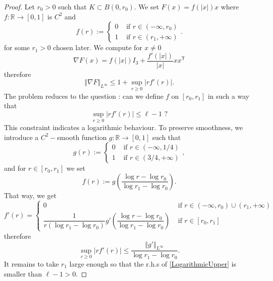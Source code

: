 \documentclass[a4paper, 12pt]{amsart}
\numberwithin{equation}{section}
\newcommand{\R}{\mathbb{R}} %
\newcommand{\lp}{\left(} %
\newcommand{\rp}{\right)} %
\newcommand{\lv}{\left\vert} %
\newcommand{\rv}{\right\vert} %
\newcommand{\lV}{\left\Vert} %
\newcommand{\rV}{\right\Vert} %
\newcommand{\Tsf}{\mathsf{T}} %
\begin{document}
\begin{proof}
    Let $r_0>0$ such that $K\subset B(0,r_0)$. We set $F(x)=f(\lv x\rv)x$ where $f:\R\rightarrow[0,1]$ is $C^2$ and
    \begin{equation*}
        f(r):=\left\{
        \begin{array}{ll}
            0 &\mbox{ if } r\in (-\infty,r_0)\\
            
            1 &\mbox{ if } r\in(r_1,+\infty)
        \end{array}.
        \right.
    \end{equation*}
    for some $r_1>0$ chosen later. We compute for $x\not=0$
    \begin{equation*}
        \nabla F(x)=f(\lv x\rv)I_3+\frac{f'(\lv x\rv)}{\lv x\rv}xx^\Tsf
    \end{equation*}
    therefore 
    \begin{equation*}
        \lV\nabla F\rV_{L^\infty}\leq 1+\sup_{r\geq0}\lv rf'(r)\rv.
    \end{equation*}
    The problem reduces to the question : can we define $f$ on $[r_0,r_1]$ in such a way that 
    \begin{equation*}
        \sup_{r\geq0}\lv rf'(r)\rv\leq\ell-1\mbox{ ?}
    \end{equation*}
    This constraint indicates a logarithmic behaviour. To preserve smoothness, we introduce a $C^2-$smooth function $g:\R\rightarrow[0,1]$ such that
    \begin{equation*}
         g(r):=\left\{
        \begin{array}{ll}
            0 &\mbox{ if } r\in (-\infty,1/4)\\
            
            1 &\mbox{ if } r\in(3/4,+\infty)
        \end{array},
        \right.
    \end{equation*}
    and for $r\in[r_0,r_1]$ we set
    \begin{equation*}
        f(r):= g\lp\frac{\log r-\log r_0}{\log r_1-\log r_0}\rp.
    \end{equation*}
    That way, we get 
    \begin{equation*}
        f'(r)=\left\{
        \begin{array}{ll}
            0 &\mbox{ if } r\in (-\infty,r_0)\cup(r_1,+\infty)\\
            
            \dfrac{1}{r(\log r_1-\log r_0)} g'\lp\dfrac{\log r-\log r_0}{\log r_1-\log r_0}\rp &\mbox{ if } r\in[r_0,r_1]
        \end{array}
        \right.
    \end{equation*}
    therefore 
    \begin{equation}\label{LogarithmicUpper}
        \sup_{r\geq0}\lv rf'(r)\rv\leq\frac{\lV g'\rV_{L^\infty}}{\log r_1-\log r_0}.
    \end{equation}
    It remains to take $r_1$ large enough so that the r.h.s of \eqref{LogarithmicUpper} is smaller than $\ell-1>0$.
\end{proof}
\end{document}

